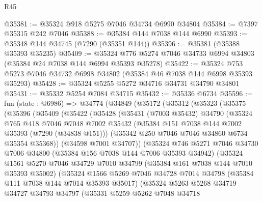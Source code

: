 \begin{lexlean}{R45}
\begin{coremodule}
{@35381 := @35324 @918 @5275 @7046 @34734 @6990 @34804
@35384 := @7397 @35315 @242 @7046
@35388 := @35384 @144 @7038 @144 @6990
@35393 := @35348 @144 @34745 (@7290 (@35351 @144))
@35396 := @35381 (@35388 @35393 @35235)
@35409 := @35324 @776 @5274 @7046 @34733 @6994 @34803 (@35384 @24 @7038 @144 @6994 @35393 @35278)
@35422 := @35324 @753 @5273 @7046 @34732 @6998 @34802 (@35384 @46 @7038 @144 @6998 @35393 @35293)
@35428 := @35324 @5255 @5272 @34716 @34731 @34790 @34801
@35431 := @35332 @5254 @7084 @34715
@35432 := @35336 @6734
@35596 := fun (state : @6986) =>
  @34774
    (@34849
      (@35172
        (@35312
          (@35323
            (@35375
              (@35396
                (@35409
                  (@35422
                    (@35428
                      (@35431
                        (@7003 @35432)
                        @34790
                        (@35324
                          @765
                          @418
                          @7046
                          @7048
                          @7002
                          @35432
                          (@35384 @151 @7038 @144 @7002 @35393 (@7290 (@34838 @151)))
                          (@35342 @250 @7046 @7046 @34860 @6734 @35354 @35368))
                        (@34598 @7001 @34707))
                      (@35324
                        @746
                        @5271
                        @7046
                        @34730
                        @7006
                        @34800
                        (@35384 @156 @7038 @144 @7006 @35393 @34942)
                        (@35324
                          @1561
                          @5270
                          @7046
                          @34729
                          @7010
                          @34799
                          (@35384 @161 @7038 @144 @7010 @35393 @35002)
                          (@35324
                            @1566
                            @5269
                            @7046
                            @34728
                            @7014
                            @34798
                            (@35384 @111 @7038 @144 @7014 @35393 @35017)
                            (@35324
                              @5263
                              @5268
                              @34719
                              @34727
                              @34793
                              @34797
                              (@35331
                                @5259
                                @5262
                                @7048
                                @34718
}
\end{coremodule}
\end{lexlean}
